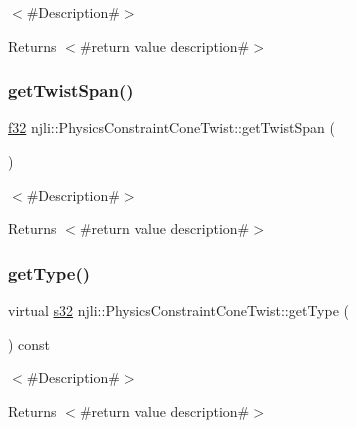 $<$\#\+Description\#$>$

\begin{DoxyReturn}{Returns}
$<$\#return value description\#$>$ 
\end{DoxyReturn}
\mbox{\label{classnjli_1_1_physics_constraint_cone_twist_a38d2f9a65c88de728a2a1f5d3255ae24}} 
\subsubsection{\texorpdfstring{get\+Twist\+Span()}{getTwistSpan()}}
{\footnotesize\ttfamily \mbox{\hyperlink{_util_8h_a5f6906312a689f27d70e9d086649d3fd}{f32}} njli\+::\+Physics\+Constraint\+Cone\+Twist\+::get\+Twist\+Span (\begin{DoxyParamCaption}{ }\end{DoxyParamCaption})}

$<$\#\+Description\#$>$

\begin{DoxyReturn}{Returns}
$<$\#return value description\#$>$ 
\end{DoxyReturn}
\mbox{\label{classnjli_1_1_physics_constraint_cone_twist_a78562bcb3f15cde1a2628732cc917fd7}} 
\subsubsection{\texorpdfstring{get\+Type()}{getType()}}
{\footnotesize\ttfamily virtual \mbox{\hyperlink{_util_8h_aa62c75d314a0d1f37f79c4b73b2292e2}{s32}} njli\+::\+Physics\+Constraint\+Cone\+Twist\+::get\+Type (\begin{DoxyParamCaption}{ }\end{DoxyParamCaption}) const\hspace{0.3cm}{\ttfamily [virtual]}}

$<$\#\+Description\#$>$

\begin{DoxyReturn}{Returns}
$<$\#return value description\#$>$ 
\end{DoxyReturn}


